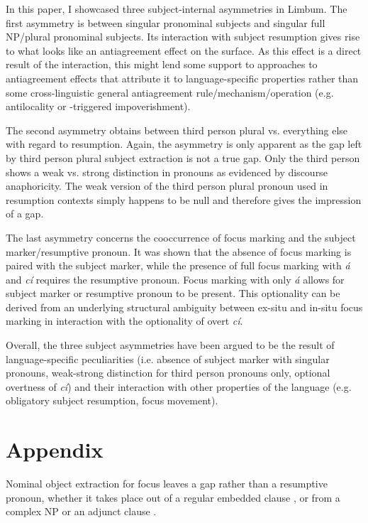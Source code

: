 \documentclass[output=paper]{langscibook}
\begin{document}
In this paper, I showcased three subject-internal asymmetries in
Limbum. The first asymmetry is between singular pronominal subjects
and singular full NP\slash plural pronominal subjects. Its interaction with
subject resumption gives rise to what looks like an antiagreement
effect on the surface. As this effect is a direct result of the
interaction, this might lend some support to approaches to antiagreement
effects that attribute it to language-specific properties
\citep{fominyam+georgi19,vanAlem19} rather than some cross-linguistic
general antiagreement rule/mechanism/operation (e.g. antilocality or
\Abar-triggered impoverishment).

The second asymmetry obtains between third person plural
vs. everything else with regard to resumption.  Again, the asymmetry is only apparent as the gap left by
third person plural subject extraction is not a true gap. Only the third person shows a weak vs. strong
distinction in pronouns as evidenced by discourse anaphoricity. The
weak version of the third person plural pronoun used in resumption
contexts simply happens to be null and therefore gives the impression of a gap.

The last asymmetry concerns the cooccurrence of focus marking and the
subject marker/re\-sump\-tive pronoun. It was shown that the absence of
focus marking is paired with the subject marker, while the presence of
full focus marking with \textit{á} and \textit{cí} requires the
resumptive pronoun. Focus marking with only \textit{á} allows for
subject marker or resumptive pronoun to be present. This optionality
can be derived from an underlying structural ambiguity between ex-situ and in-situ focus marking in
interaction with the optionality of overt \textit{cí}. 

Overall, the three subject asymmetries have been argued to be the
result of language-specific peculiarities (i.e. absence of subject marker with singular pronouns, weak-strong
distinction for third person pronouns only, optional overtness
of \textit{cí})
and their interaction with other properties of the language
(e.g. obligatory subject resumption, focus movement).



\section*{Appendix}
\label{sec:johanneshein:appendix}

Nominal object extraction for focus leaves a gap rather than a resumptive pronoun, whether it takes place out of a regular embedded
  clause , or from a complex NP  or an adjunct clause
  .
\end{document}
